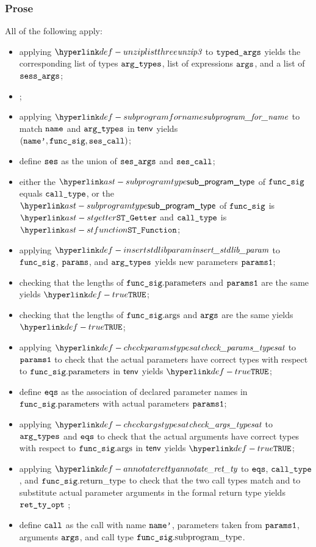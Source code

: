 \subsubsection{Prose}
All of the following apply:
\begin{itemize}
  \item applying $\unziplistthree$ to $\texttt{typed\_args}$ yields the corresponding list of types $\texttt{arg\_types}$,
        list of expressions $\texttt{args}$, and a list of \sideeffectdescriptorsetsterm\ $\vsessargs$;
  \item \Prosenonconflictingunion{$\vsessargs$}{$\vsesargs$};
  \item applying $\subprogramforname$ to match $\texttt{name}$ and $\texttt{arg\_types}$ in $\textsf{tenv}$
        yields \\ $(\texttt{name'}, \texttt{func\_sig}, \texttt{ses\_call})$\ProseOrTypeError;
  \item define $\texttt{ses}$ as the union of $\vsesargs$ and $\texttt{ses\_call}$;
  \item either the $\subprogramtype$ of $\texttt{func\_sig}$ equals $\texttt{call\_type}$,
        or the $\subprogramtype$ of $\texttt{func\_sig}$ is $\STGetter$ and $\texttt{call\_type}$ is $\STFunction$\ProseTerminateAs{\MismatchedReturnValue};
  \item applying $\insertstdlibparam$ to $\texttt{func\_sig}$, $\texttt{params}$, and $\texttt{arg\_types}$ yields new parameters $\texttt{params1}$;
  \item checking that the lengths of $\texttt{func\_sig}.\text{parameters}$ and $\texttt{params1}$ are the same yields $\True$\ProseTerminateAs{\CallBadParameterArity};
  \item checking that the lengths of $\texttt{func\_sig}.\text{args}$ and $\texttt{args}$ are the same yields $\True$\ProseTerminateAs{\CallBadArity};
  \item applying $\checkparamstypesat$ to $\texttt{params1}$
        to check that the actual parameters have correct types with respect to $\texttt{func\_sig}.\text{parameters}$
        in $\textsf{tenv}$ yields $\True$\ProseOrTypeError;
  \item define $\texttt{eqs}$ as the association of declared parameter names in $\texttt{func\_sig}.\text{parameters}$ with actual parameters $\texttt{params1}$;
  \item applying $\checkargstypesat$ to $\texttt{arg\_types}$ and $\texttt{eqs}$
        to check that the actual arguments have correct types with respect to $\texttt{func\_sig}.\text{args}$
        in $\textsf{tenv}$ yields $\True$\ProseOrTypeError;
  \item applying $\annotateretty$ to $\texttt{eqs}$, $\texttt{call\_type}$, and $\texttt{func\_sig}.\text{return\_type}$
        to check that the two call types match and to substitute actual parameter arguments in the formal return type
        yields $\texttt{ret\_ty\_opt}$ \ProseOrTypeError;
  \item define $\texttt{call}$ as the call with name $\texttt{name'}$, parameters taken from $\texttt{params1}$, arguments $\texttt{args}$,
        and call type $\texttt{func\_sig}.\text{subprogram\_type}$.
\end{itemize}
